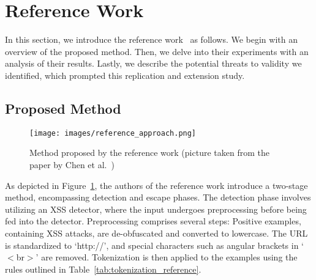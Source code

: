 \section{Reference Work}
\label{sec:reference}

In this section, we  introduce the reference work~\cite{CHEN2022102831} as follows. We begin with an overview of the proposed method. Then, we delve into their experiments with an analysis of their results. Lastly, we describe the potential threats to validity we identified, which prompted this replication and extension study.



\subsection{Proposed Method}


\begin{figure}[!t]
  \centering
  \texttt{[image: images/reference\_approach.png]}
  
  \caption{Method proposed by the reference work (picture taken from the paper by Chen et al.~\cite{CHEN2022102831})} \label{fig:reference_method}
\end{figure}


As depicted in Figure~\ref{fig:reference_method}, the authors of the reference work introduce a two-stage method, encompassing detection and escape phases. The detection phase involves utilizing an XSS detector, where the input undergoes preprocessing before being fed into the detector. Preprocessing comprises several steps: Positive examples, containing XSS attacks, are de-obfuscated and converted to lowercase. The URL is standardized to `http://', and special characters such as angular brackets in `$<$br$>$' are removed. Tokenization is then applied to the examples using the rules outlined in Table~\ref{tab:tokenization_reference}.


